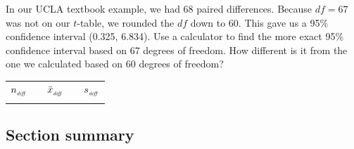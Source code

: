 \begin{exercisewrap}
\begin{nexercise}
In our UCLA textbook example, we had 68 paired differences.  Because $df=67$ was not on our $t$-table, we rounded the $df$ down to 60.  This gave us a 95\% confidence interval (0.325, 6.834).  Use a calculator to find the more exact 95\% confidence interval based on 67 degrees of freedom.  How different is it from the one we calculated based on 60 degrees of freedom?\footnotemark
\begin{center}
\begin{tabular}{ccccc}
\hline
$n_{_{\text{\emph{diff}}}}$	&\hspace{3mm}& $\bar{x}_{_{\text{\emph{diff}}}}$	&\hspace{3mm}& $s_{_{\text{\emph{diff}}}}$ \vspace{1mm}\\
\uclabookN{}  && \uclabookM{}  && \uclabookSD{} \\
\hline
\end{tabular}
\end{center}
\end{nexercise}
\end{exercisewrap}



\D{\newpage}

\subsection*{Section summary}

